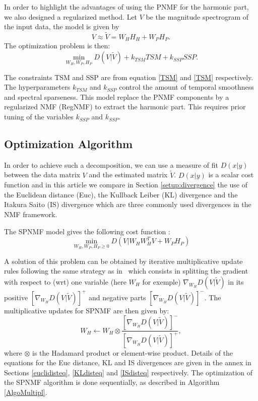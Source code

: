 In order to highlight the advantages of using the PNMF for the harmonic part, we also designed a regularized method. Let $V$ be the magnitude spectrogram of the input data, the model is given by 
\begin{equation}
V \approx \tilde{V} = W_HH_H + W_P  H_P.
\end{equation}
The optimization problem is then:
\begin{equation}\label{REGNMF}
\min_{W_{H},W_{P},H_{P}}D(V|\tilde{V}) + k_{TSM} TSM + k_{SSP} SSP.
\end{equation} 

The constraints TSM and SSP are from equation \eqref{TSM} and \eqref{TSM} respectively. The hyperparameters $k_{TSM}$ and $k_{SSP}$ control the amount of temporal smoothness and spectral sparseness. This model replace the PNMF components by a regularized NMF (RegNMF) to extract the harmonic part. This requires prior tuning of the variables $k_{SSP}$ and $k_{SSP}$. 


\subsection{Optimization Algorithm}

In order to achieve such a decomposition, we can use a measure of fit $D(x|y)$ between the data matrix $V$ and the estimated matrix $\tilde{V}$. $D(x|y)$ is a scalar cost function and in this article we compare in Section \ref{setup:divergence} the use of the Euclidean distance (Euc), the Kullback Leiber (KL) divergence and the Itakura Saito (IS) divergence which are three commonly used divergences in the NMF framework.



The SPNMF model gives the following cost function : 
\begin{equation}\label{InitCost}
\min_{W_H,W_P,H_P \geq 0} D(V|W_{H}W_{H}^{T}V + W_{P} H_{P})  
\end{equation}

A solution of this problem can be obtained by iterative multiplicative update rules following the same strategy as in~\cite{yuanOja2005,Lee01algorithmsfor} which consists in splitting the gradient with respect to (wrt) one variable (here $W_H$ for exemple) $\nabla_{W_H} D(V|\tilde{V})$ in its positive $[\nabla_{W_H} D(V|\tilde{V})]^{+}$ and negative parts $[\nabla_{W_H} D(V|\tilde{V})]^{-}$.
The multiplicative updates for SPNMF are then given by: 
$$W_{H} \leftarrow W_{H} \otimes \frac{ [\nabla_{W_H} D(V|\tilde{V})]^{-} }{[\nabla_{W_H} D(V|\tilde{V})]^{+}}, $$
where $\otimes$ is the Hadamard product or element-wise product. Details of the equations for the Euc distance, KL and IS divergences are given in the annex in Sections \ref{euclidisteq}, \ref{KLdisteq} and \ref{ISdisteq} respectively. 
The optimization of the SPNMF algorithm is done sequentially, as described in Algorithm \ref{AlgoMultipl}.

